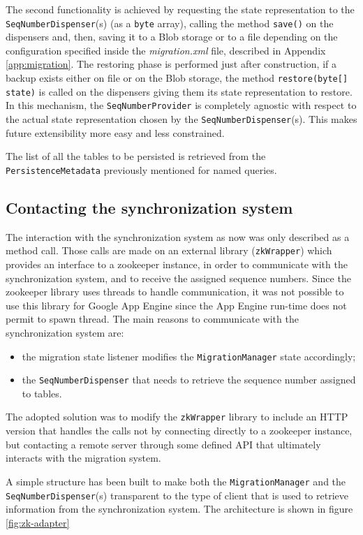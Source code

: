 \newparagraph The second functionality is achieved by requesting the state representation to the \texttt{SeqNumberDispenser}(s) (as a \texttt{byte} array), calling the method \texttt{save()} on the dispensers and, then, saving it to a Blob storage or to a file depending on the configuration specified inside the \textit{migration.xml} file, described in Appendix \ref{app:migration}. 
\noindent The restoring phase is performed just after construction, if a backup exists either on file or on the Blob storage, the method \texttt{restore(byte[] state)} is called on the dispensers giving them its state representation to restore.
In this mechanism, the \texttt{SeqNumberProvider} is completely agnostic with respect to the actual state representation chosen by the \texttt{SeqNumberDispenser}(s). This makes future extensibility more easy and less constrained.

\noindent The list of all the tables to be persisted is retrieved from the \texttt{PersistenceMetadata} previously mentioned for named queries.
 
\subsection{Contacting the synchronization system}
The interaction with the synchronization system as now was only described as a method call. Those calls are made on an external library (\texttt{zkWrapper}) which provides an interface to a zookeeper instance, in order to communicate with the synchronization system, and to receive the assigned sequence numbers.
Since the zookeeper library uses threads to handle communication, it was not possible to use this library for Google App Engine since the App Engine run-time does not permit to spawn thread.
The main reasons to communicate with the synchronization system are:
\begin{itemize}
\item the migration state listener modifies the \texttt{MigrationManager} state accordingly;
\item the \texttt{SeqNumberDispenser} that needs to retrieve the sequence number assigned to tables.
\end{itemize} 
\noindent The adopted solution was to modify the \texttt{zkWrapper} library to include an HTTP version that handles the calls not by connecting directly to a zookeeper instance, but contacting a remote server through some defined API that ultimately interacts with the migration system.

\newparagraph A simple structure has been built to make both the \texttt{MigrationManager} and the \texttt{SeqNumberDispenser}(s) transparent to the type of client that is used to retrieve information from the synchronization system. The architecture is shown in figure \ref{fig:zk-adapter}

